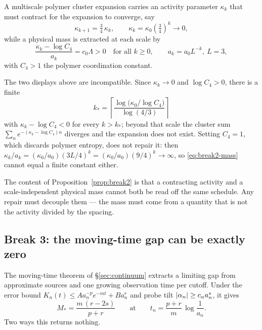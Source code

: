 A multiscale polymer cluster expansion carries an activity parameter
$\kappa_k$ that must contract for the expansion to converge, say
\begin{equation}
  \kappa_{k+1} = \tfrac{3}{4}\,\kappa_k,
  \qquad \kappa_k = \kappa_0 \left(\tfrac{3}{4}\right)^{k} \longrightarrow 0,
\end{equation}
while a physical mass is extracted at each scale by
\begin{equation}
  \frac{\kappa_k - \log C_4}{a_k} = c_0 \Lambda > 0
  \quad\text{for all } k \ge 0,
  \qquad a_k = a_0 L^{-k},\ L = 3,
  \label{eq:break2-mass}
\end{equation}
with $C_4 > 1$ the polymer coordination constant.

\begin{proposition}
\label{prop:break2}
The two displays above are incompatible. Since $\kappa_k \to 0$ and
$\log C_4 > 0$, there is a finite
\[
  k_* = \left\lceil \frac{\log\!\big(\kappa_0/\log C_4\big)}{\log(4/3)} \right\rceil
\]
with $\kappa_k - \log C_4 < 0$ for every $k > k_*$; beyond that scale the
cluster sum $\sum_n e^{-(\kappa_k - \log C_4)n}$ diverges and the
expansion does not exist. Setting $C_4 = 1$, which discards polymer
entropy, does not repair it: then
$\kappa_k / a_k = (\kappa_0/a_0)(3L/4)^k = (\kappa_0/a_0)(9/4)^k \to \infty$,
so \eqref{eq:break2-mass} cannot equal a finite constant either.
\end{proposition}

The content of Proposition~\ref{prop:break2} is that a contracting
activity and a scale-independent physical mass cannot both be read off
the same schedule. Any repair must decouple them --- the mass must come
from a quantity that is not the activity divided by the spacing.

\subsection{Break 3: the moving-time gap can be exactly zero}
\label{sec:break3}

The moving-time theorem of \S\ref{sec:continuum} extracts a limiting
gap from approximate sources and one growing observation time per
cutoff. Under the error bound
$K_n(t) \le A a_n^{-p} e^{-mt} + B a_n^{r}$ and probe tilt
$\left\lvert \alpha_n \right\rvert \ge c_\alpha a_n^{s}$, it gives
\begin{equation}
  M_* = \frac{m\,(r - 2s)}{p + r}
  \qquad\text{at}\qquad
  t_n = \frac{p+r}{m}\,\log\frac{1}{a_n}.
  \label{eq:break3}
\end{equation}
Two ways this returns nothing.

